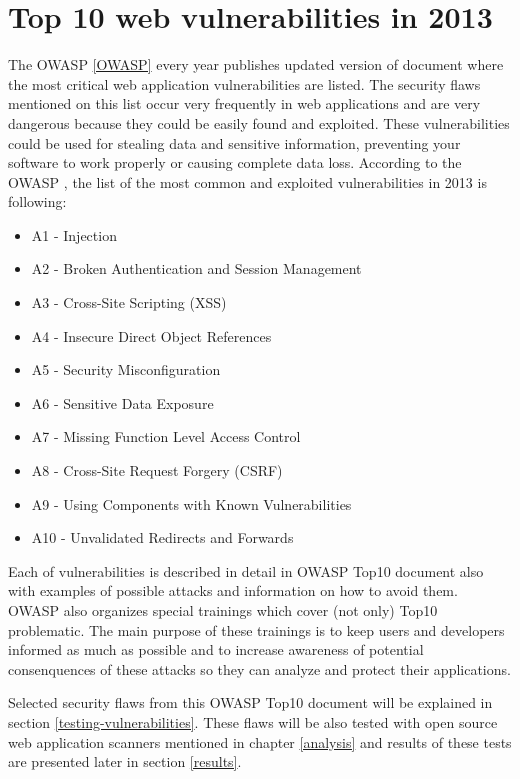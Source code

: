 	\section{Top 10 web vulnerabilities in 2013}

	The OWASP \ref{OWASP} every year publishes updated version of document where the most critical web application vulnerabilities are listed. The security flaws mentioned on this list occur very frequently in web applications and are very dangerous because they could be easily found and exploited. These vulnerabilities could be used for stealing data and sensitive information, preventing your software to work properly or causing complete data loss. According to the OWASP \cite{OWASPtop10}, the list of the most common and exploited vulnerabilities in 2013 is following:
	
	\begin{itemize}
		\item A1  - Injection
		\item A2  - Broken Authentication and Session Management
		\item A3  - Cross-Site Scripting (XSS)
		\item A4  - Insecure Direct Object References
		\item A5  - Security Misconfiguration
		\item A6  - Sensitive Data Exposure
		\item A7  - Missing Function Level Access Control
		\item A8  - Cross-Site Request Forgery (CSRF)
		\item A9  - Using Components with Known Vulnerabilities
		\item A10 - Unvalidated Redirects and Forwards
	\end{itemize}
	
	Each of vulnerabilities is described in detail in OWASP Top10 document also with examples of possible attacks and information on how to avoid them. OWASP also organizes special trainings which cover (not only) Top10 problematic. The main purpose of these trainings is to keep users and developers informed as much as possible and to increase awareness of potential consenquences of these attacks so they can analyze and protect their applications.

	Selected security flaws from this OWASP Top10 document will be explained in section \ref{testing-vulnerabilities}. These flaws will be also tested with open source web application scanners mentioned in chapter \ref{analysis} and results of these tests are presented later in section \ref{results}.


